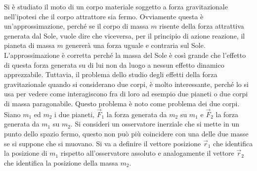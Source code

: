 Si è studiato il moto di un corpo materiale soggetto a forza gravitazionale nell'ipotesi che il corpo attrattore sia fermo. Ovviamente questa è un'approssimazione, perché se il corpo di massa $m$ risente della forza attrattiva generata dal Sole, vuole dire che viceversa, per il principio di azione reazione, il pianeta di massa $m$ genererà una forza uguale e contraria sul Sole. L'approssimazione è corretta perché la massa del Sole è così grande che l'effetto di questa forza generata su di lui non da luogo a nessun effetto dinamico apprezzabile. Tuttavia, il problema dello studio degli effetti della forza gravitazionale quando si considerano due corpi, è molto interessante, perché lo si usa per vedere come interagiscono fra di loro ad esempio due pianeti o due corpi di massa paragonabile. Questo problema è noto come problema dei due corpi. Siano $m_1$ ed $m_2$ i due pianeti, $\vec{F}_1$ la forza generata da $m_2$ su $m_1$ e $\vec{F}_2$ la forza generata da $m_1$ su $m_2$. Si consideri un osservatore inerziale che si mette in un punto dello spazio fermo, questo non può più coincidere con una delle due masse se si suppone che si muovano. Si va a definire il vettore posizione $\vec{r}_1$ che identifica la posizione di $m_1$ rispetto all'osservatore assoluto e analogamente il vettore $\vec{r}_2$ che identifica la posizione della massa $m_2$.


